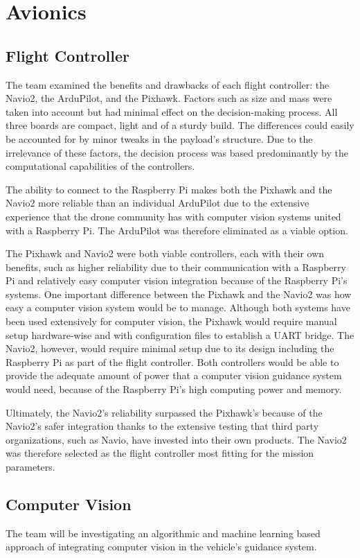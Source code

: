 	\section{Avionics}\label{PL:Design:Avionics}
		\subsection{Flight Controller}
		The team examined the benefits and drawbacks of each flight controller: the Navio2, the ArduPilot, and the Pixhawk. Factors such as size and mass were taken into account but had minimal effect on the decision-making process. All three boards are compact, light and of a sturdy build. The differences could easily be accounted for by minor tweaks in the payload’s structure. Due to the irrelevance of these factors, the decision process was based predominantly by the computational capabilities of the controllers. 

		The ability to connect to the Raspberry Pi makes both the Pixhawk and the Navio2 more reliable than an individual ArduPilot due to the extensive experience that the drone community has with computer vision systems united with a Raspberry Pi. The ArduPilot was therefore eliminated as a viable option. 
		
		The Pixhawk and Navio2 were both viable controllers, each with their own benefits, such as higher reliability due to their communication with a Raspberry Pi and relatively easy computer vision integration because of the Raspberry Pi’s systems. One important difference between the Pixhawk and the Navio2 was how easy a computer vision system would be to manage. Although both systems have been used extensively for computer vision, the Pixhawk would require manual setup hardware-wise and with configuration files to establish a UART bridge. The Navio2, however, would require minimal setup due to its design including the Raspberry Pi as part of the flight controller. Both controllers would be able to provide the adequate amount of power that a computer vision guidance system would need, because of the Raspberry Pi’s high computing power and memory. 
		
		Ultimately, the Navio2’s reliability surpassed the Pixhawk’s because of the Navio2’s safer integration thanks to the extensive testing that third party organizations, such as Navio, have invested into their own products. The Navio2 was therefore selected as the flight controller most fitting for the mission parameters. 

		\subsection{Computer Vision}
		The team will be investigating an algorithmic and machine learning based approach of integrating computer vision in the vehicle’s guidance system. 

